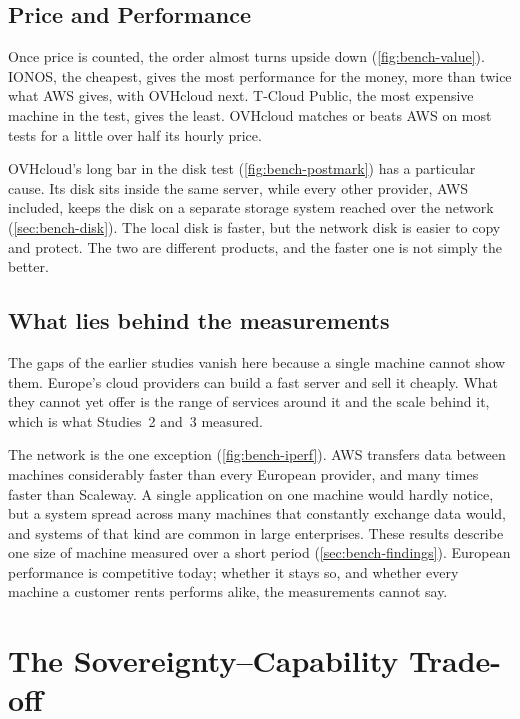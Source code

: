 \subsection{Price and Performance}
\label{subsec:price-performance}

Once price is counted, the order almost turns upside down (\cref{fig:bench-value}).
IONOS, the cheapest, gives the most performance for the money, more than twice
what \acs{AWS} gives, with OVHcloud next. T-Cloud Public, the most expensive
machine in the test, gives the least. OVHcloud matches or beats \acs{AWS} on most
tests for a little over half its hourly price.

OVHcloud's long bar in the disk test (\cref{fig:bench-postmark}) has a particular
cause. Its disk sits inside the same server, while every other provider,
\acs{AWS} included, keeps the disk on a separate storage system reached over the
network (\cref{sec:bench-disk}). The local disk is faster, but the network disk is
easier to copy and protect. The two are different products, and the faster one is
not simply the better.

\subsection{What lies behind the measurements}
\label{subsec:study4-interpretation}

The gaps of the earlier studies vanish here because a single machine cannot show
them. Europe's cloud providers can build a fast server and sell it cheaply. What
they cannot yet offer is the range of services around it and the scale behind it,
which is what Studies~2 and~3 measured.

The network is the one exception (\cref{fig:bench-iperf}). \acs{AWS} transfers
data between machines considerably faster than every European provider, and many
times faster than Scaleway. A single application on one machine would hardly notice, but a
system spread across many machines that constantly exchange data would, and
systems of that kind are common in large enterprises. These results describe one
size of machine measured over a short period (\cref{sec:bench-findings}). European
performance is competitive today; whether it stays so, and whether every machine a
customer rents performs alike, the measurements cannot say.

\section{The Sovereignty--Capability Trade-off}
\label{sec:tradeoff}

